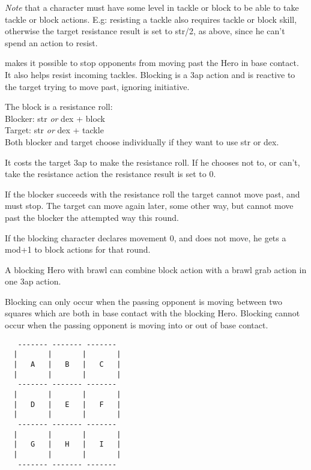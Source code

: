 \emph{Note} that a character must have some level in tackle or block to be able to take tackle or block actions. E.g: resisting a tackle also requires tackle or block skill, otherwise the target resistance result is set to str/2, as above, since he can't spend an action to resist.


 makes it possible to stop opponents from moving past the Hero in base contact. It also helps resist incoming tackles. Blocking is a 3ap action and is reactive to the target trying to move past, ignoring initiative.

The block is a resistance roll: \\
Blocker: str \emph{or} dex + block \\
Target: str \emph{or} dex + tackle \\
Both blocker and target choose individually if they want to use str or dex.

It costs the target 3ap to make the resistance roll. If he chooses not to, or can't, take the resistance action the resistance result is set to 0.

If the blocker succeeds with the resistance roll the target cannot move past, and must stop. The target can move again later, some other way, but cannot move past the blocker the attempted way this round.

If the blocking character declares movement 0, and does not move, he gets a mod+1 to block actions for that round.

A blocking Hero with brawl can combine block action with a brawl grab action in one 3ap action.

Blocking can only occur when the passing opponent is moving between two squares which are both in base contact with the blocking Hero. Blocking cannot occur when the passing opponent is moving into or out of base contact.

\begin{samepage} \goodbreak
\scriptsize \begin{verbatim}
   ------- ------- -------
  |       |       |       |
  |   A   |   B   |   C   |
  |       |       |       |
   ------- ------- -------
  |       |       |       |
  |   D   |   E   |   F   |
  |       |       |       |
   ------- ------- -------
  |       |       |       |
  |   G   |   H   |   I   |
  |       |       |       |
   ------- ------- -------
\end{verbatim} \normalsize
\end{samepage}

